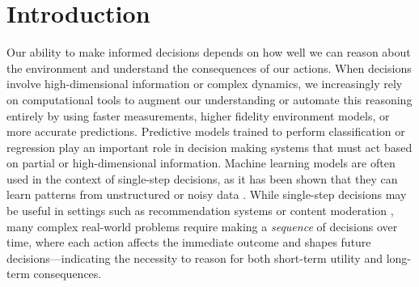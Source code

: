 \chapter{Introduction}

Our ability to make informed decisions depends on how well we can reason about the environment and understand the consequences of our actions.
When decisions involve high-dimensional information or complex dynamics, we increasingly rely on computational tools to augment our understanding or automate this reasoning entirely by using faster measurements, higher fidelity environment models, or more accurate predictions.
Predictive models trained to perform classification or regression play an important role in decision making systems that must act based on partial or high-dimensional information.
Machine learning models are often used in the context of single-step decisions, as it has been shown that they can learn patterns from unstructured or noisy data \cite{murphy2012machine,bishop2006pattern}.
While single-step decisions may be useful in settings such as recommendation systems \cite{covington2016deep} or content moderation \cite{wulczyn2017ex}, many complex real-world problems require making a \textit{sequence} of decisions over time, where each action affects the immediate outcome and shapes future decisions---indicating the necessity to reason for both short-term utility and long-term consequences.


